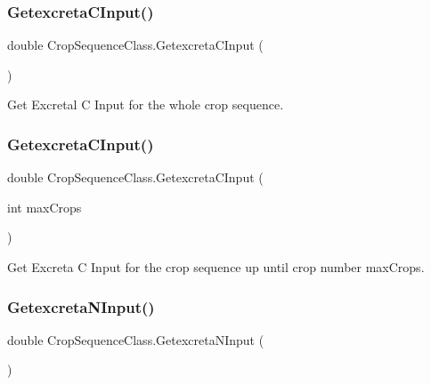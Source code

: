 \subsubsection{\texorpdfstring{GetexcretaCInput()}{GetexcretaCInput()}\hspace{0.1cm}{\footnotesize\ttfamily [1/2]}}
{\footnotesize\ttfamily double Crop\+Sequence\+Class.\+Getexcreta\+C\+Input (\begin{DoxyParamCaption}{ }\end{DoxyParamCaption})\hspace{0.3cm}{\ttfamily [inline]}}



Get Excretal C Input for the whole crop sequence. 

\mbox{\label{class_crop_sequence_class_a1a450f8a00bdf08b51a6e2887414740c}} 
\subsubsection{\texorpdfstring{GetexcretaCInput()}{GetexcretaCInput()}\hspace{0.1cm}{\footnotesize\ttfamily [2/2]}}
{\footnotesize\ttfamily double Crop\+Sequence\+Class.\+Getexcreta\+C\+Input (\begin{DoxyParamCaption}\item[{int}]{max\+Crops }\end{DoxyParamCaption})\hspace{0.3cm}{\ttfamily [inline]}}



Get Excreta C Input for the crop sequence up until crop number max\+Crops. 

\mbox{\label{class_crop_sequence_class_a6796771f354e44de318c5801a1842285}} 
\subsubsection{\texorpdfstring{GetexcretaNInput()}{GetexcretaNInput()}\hspace{0.1cm}{\footnotesize\ttfamily [1/2]}}
{\footnotesize\ttfamily double Crop\+Sequence\+Class.\+Getexcreta\+N\+Input (\begin{DoxyParamCaption}{ }\end{DoxyParamCaption})\hspace{0.3cm}{\ttfamily [inline]}}



